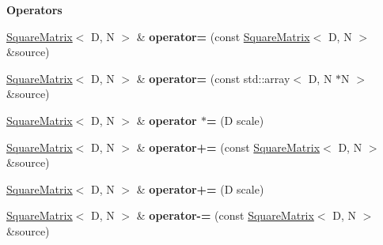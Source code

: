 \begin{Indent}\textbf{ Operators}\par
{\em 
\begin{DoxyItemize}
\item 
\end{DoxyItemize}}\begin{DoxyCompactItemize}
\item 
\mbox{\label{classrev_1_1_square_matrix_ae8320472164d65e4521e98bba1b2d028}} 
\mbox{\hyperlink{classrev_1_1_square_matrix}{Square\+Matrix}}$<$ D, N $>$ \& {\bfseries operator=} (const \mbox{\hyperlink{classrev_1_1_square_matrix}{Square\+Matrix}}$<$ D, N $>$ \&source)
\item 
\mbox{\label{classrev_1_1_square_matrix_a87a511af00927d9035a1770ec7ba1fc1}} 
\mbox{\hyperlink{classrev_1_1_square_matrix}{Square\+Matrix}}$<$ D, N $>$ \& {\bfseries operator=} (const std\+::array$<$ D, N $\ast$N $>$ \&source)
\item 
\mbox{\label{classrev_1_1_square_matrix_a4c992537709d986d9a8dc3b37e2abb0b}} 
\mbox{\hyperlink{classrev_1_1_square_matrix}{Square\+Matrix}}$<$ D, N $>$ \& {\bfseries operator $\ast$=} (D scale)
\item 
\mbox{\label{classrev_1_1_square_matrix_a8d638708d339016871a9ab699fdd8da8}} 
\mbox{\hyperlink{classrev_1_1_square_matrix}{Square\+Matrix}}$<$ D, N $>$ \& {\bfseries operator+=} (const \mbox{\hyperlink{classrev_1_1_square_matrix}{Square\+Matrix}}$<$ D, N $>$ \&source)
\item 
\mbox{\label{classrev_1_1_square_matrix_aadd1871a525a7a86a918f832f19f1d43}} 
\mbox{\hyperlink{classrev_1_1_square_matrix}{Square\+Matrix}}$<$ D, N $>$ \& {\bfseries operator+=} (D scale)
\item 
\mbox{\label{classrev_1_1_square_matrix_aaf4d87782c0f37422f62da6da2150ef8}} 
\mbox{\hyperlink{classrev_1_1_square_matrix}{Square\+Matrix}}$<$ D, N $>$ \& {\bfseries operator-\/=} (const \mbox{\hyperlink{classrev_1_1_square_matrix}{Square\+Matrix}}$<$ D, N $>$ \&source)
\item 
\mbox{\label{classrev_1_1_square_matrix_a33ae22aa071eba7de3eac0b033dcd83b}} 

\end{DoxyCompactItemize}
\end{Indent}

